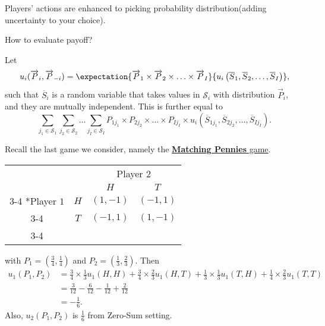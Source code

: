 \hr

Players' actions are enhanced to picking probability distribution(adding uncertainty to your choice).

\begin{problem}
How to evaluate payoff?
\end{problem}
\begin{answer}
	Let
	\[
		u_{i}(\overrightarrow{P}_i, \overrightarrow{P}_{-i}) = \expectation{\overrightarrow{P}_{1}\times \overrightarrow{P}_2 \times \ldots \times \overrightarrow{P}_I}{u_{i}\left(\overline{S}_1, \overline{S}_2, \ldots , \overline{S}_I\right)},
	\]
	such that \(\overline{S}_i\) is a random variable that takes values in \(\mathcal{S}_i\) with distribution \(\overrightarrow{P}_i\), and they are mutually independent. This is further equal to
	\[
		\sum\limits_{j_1\in \mathcal{S}_1 }\sum\limits_{j_2\in \mathcal{S}_2}\ldots \sum\limits_{j_I\in \mathcal{S}_I }P_{1j_1}\times P_{2j_2}\times \ldots \times P_{Ij_I}\times u_{i}\left(\overline{S}_{1j_1}, \overline{S}_{2j_2}, \ldots , \overline{S}_{Ij_I}\right).
	\]
\end{answer}
\begin{eg}
	Recall the last game we consider, namely the \hyperref[matching-pennies]{\textbf{Matching Pennies} game}.
	\begin{table}[H]
		\centering
		\setlength{\extrarowheight}{2pt}
		\begin{tabular}{cc|c|c|}
			                          & \multicolumn{1}{c}{} & \multicolumn{2}{c}{Player $2$}                           \\
			                          & \multicolumn{1}{c}{} & \multicolumn{1}{c}{$H$}        & \multicolumn{1}{c}{$T$} \\\cline{3-4}
			\multirow{2}*{Player $1$} & $H$                  & $(1, -1)$                      & $(-1, 1)$               \\\cline{3-4}
			                          & $T$                  & $(-1, 1)$                      & $(1, -1)$               \\\cline{3-4}
		\end{tabular}
	\end{table}
	with \(P_1 = (\frac{3}{4}, \frac{1}{4})\) and \(P_2 = (\frac{1}{3}, \frac{2}{3})\). Then
	\[
		\begin{split}
			u_1(P_1, P_2) &= \frac{3}{4}\times \frac{1}{3} u_1(H, H) + \frac{3}{4}\times \frac{2}{3}u_1(H, T) + \frac{1}{3}\times \frac{1}{3}u_1(T, H)+\frac{1}{4}\times \frac{2}{3}u_1(T, T)\\
			&= \frac{3}{12} - \frac{6}{12} - \frac{1}{12} + \frac{2}{12}\\
			&= -\frac{1}{6}.
		\end{split}
	\]
	Also, \(u_2(P_1, P_2)\) is \(\frac{1}{6}\) from Zero-Sum setting.
\end{eg}

